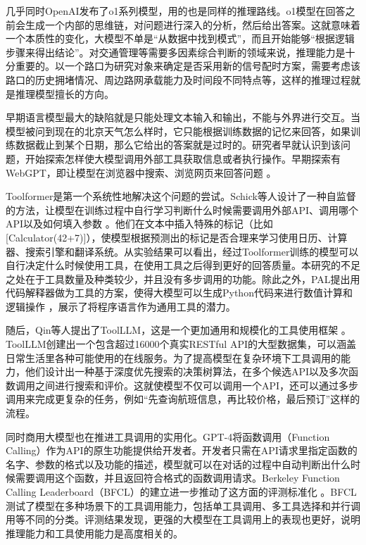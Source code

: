 几乎同时OpenAI发布了o1系列模型，用的也是同样的推理路线。o1模型在回答之前会生成一个内部的思维链，对问题进行深入的分析，然后给出答案。这就意味着一个本质性的变化，大模型不单是“从数据中找到模式”，而且开始能够“根据逻辑步骤来得出结论”。对交通管理等需要多因素综合判断的领域来说，推理能力是十分重要的。以一个路口为研究对象来确定是否采用新的信号配时方案，需要考虑该路口的历史拥堵情况、周边路网承载能力及时间段不同特点等，这样的推理过程就是推理模型擅长的方向。

早期语言模型最大的缺陷就是只能处理文本输入和输出，不能与外界进行交互。当模型被问到现在的北京天气怎么样时，它只能根据训练数据的记忆来回答，如果训练数据截止到某个日期，那么它给出的答案就是过时的。研究者早就认识到该问题，开始探索怎样使大模型调用外部工具获取信息或者执行操作。早期探索有WebGPT，即让模型在浏览器中搜索、浏览网页来回答问题 。

Toolformer是第一个系统性地解决这个问题的尝试。Schick等人设计了一种自监督的方法，让模型在训练过程中自行学习判断什么时候需要调用外部API、调用哪个API以及如何填入参数 。他们在文本中插入特殊的标记（比如[Calculator(42+7)]），使模型根据预测出的标记是否合理来学习使用日历、计算器、搜索引擎和翻译系统。从实验结果可以看出，经过Toolformer训练的模型可以自行决定什么时候使用工具，在使用工具之后得到更好的回答质量。本研究的不足之处在于工具数量及种类较少，并且没有多步调用的功能。除此之外，PAL提出用代码解释器做为工具的方案，使得大模型可以生成Python代码来进行数值计算和逻辑操作 ，展示了将程序语言作为通用工具的潜力。

随后，Qin等人提出了ToolLLM，这是一个更加通用和规模化的工具使用框架 。ToolLLM创建出一个包含超过16000个真实RESTful API的大型数据集，可以涵盖日常生活里各种可能使用的在线服务。为了提高模型在复杂环境下工具调用的能力，他们设计出一种基于深度优先搜索的决策树算法，在多个候选API以及多次函数调用之间进行搜索和评价。这就使模型不仅可以调用一个API，还可以通过多步调用来完成更复杂的任务，例如“先查询航班信息，再比较价格，最后预订”这样的流程。

同时商用大模型也在推进工具调用的实用化。GPT-4将函数调用（Function Calling）作为API的原生功能提供给开发者。开发者只需在API请求里指定函数的名字、参数的格式以及功能的描述，模型就可以在对话的过程中自动判断出什么时候需要调用这个函数，并且返回符合格式的函数调用请求。Berkeley Function Calling Leaderboard（BFCL）的建立进一步推动了这方面的评测标准化 。BFCL测试了模型在多种场景下的工具调用能力，包括单工具调用、多工具选择和并行调用等不同的分类。评测结果发现，更强的大模型在工具调用上的表现也更好，说明推理能力和工具使用能力是高度相关的。

